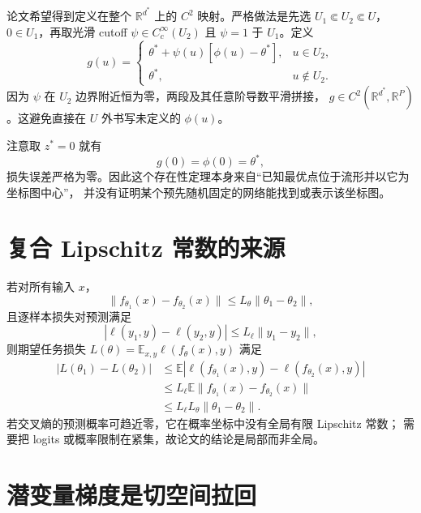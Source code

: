 \documentclass[11pt]{article}
\numberwithin{equation}{section}
\newcommand{\R}{\mathbb{R}}
\newcommand{\E}{\mathbb{E}}
\newcommand{\1}{\mathbf{1}}
\begin{document}
论文希望得到定义在整个 $\R^{d^*}$ 上的 $C^2$ 映射。严格做法是先选
$U_1\Subset U_2\Subset U$，$0\in U_1$，再取光滑 cutoff
$\psi\in C_c^\infty(U_2)$ 且 $\psi=1$ 于 $U_1$。定义
\begin{equation}
 g(u)=
 \begin{cases}
 \theta^*+\psi(u)[\phi(u)-\theta^*],&u\in U_2,\\
 \theta^*,&u\notin U_2.
 \end{cases}
\end{equation}
因为 $\psi$ 在 $U_2$ 边界附近恒为零，两段及其任意阶导数平滑拼接，
$g\in C^2(\R^{d^*},\R^P)$。这避免直接在 $U$ 外书写未定义的 $\phi(u)$。

注意取 $z^*=0$ 就有
\begin{equation}
 g(0)=\phi(0)=\theta^*,
\end{equation}
损失误差严格为零。因此这个存在性定理本身来自“已知最优点位于流形并以它为坐标图中心”，
并没有证明某个预先随机固定的网络能找到或表示该坐标图。

\section{复合 Lipschitz 常数的来源}

若对所有输入 $x$，
\begin{equation}
 \|f_{\theta_1}(x)-f_{\theta_2}(x)\|
 \le L_\theta\|\theta_1-\theta_2\|,
\end{equation}
且逐样本损失对预测满足
\begin{equation}
 |\ell(y_1,y)-\ell(y_2,y)|\le L_\ell\|y_1-y_2\|,
\end{equation}
则期望任务损失
$L(\theta)=\E_{x,y}\ell(f_\theta(x),y)$ 满足
\begin{align}
 |L(\theta_1)-L(\theta_2)|
 &\le\E|\ell(f_{\theta_1}(x),y)-\ell(f_{\theta_2}(x),y)|\\
 &\le L_\ell\E\|f_{\theta_1}(x)-f_{\theta_2}(x)\|\\
 &\le L_\ell L_\theta\|\theta_1-\theta_2\|.
\end{align}
若交叉熵的预测概率可趋近零，它在概率坐标中没有全局有限 Lipschitz 常数；
需要把 logits 或概率限制在紧集，故论文的结论是局部而非全局。

\section{潜变量梯度是切空间拉回}
\end{document}
